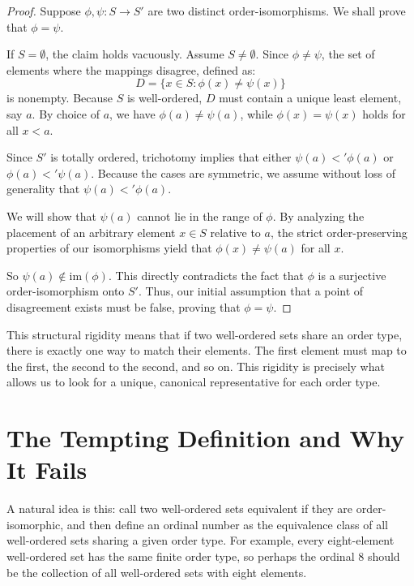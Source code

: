 \documentclass[11pt]{article}
\begin{document}
\begin{proof}
Suppose $\phi, \psi:S\to S'$ are two distinct order-isomorphisms. We shall prove that \(\phi=\psi\).

If \(S=\emptyset\), the claim holds vacuously. Assume \(S\neq\emptyset\). Since $\phi \neq \psi$, the set of elements where the mappings disagree, defined as:
\[
D=\{x\in S:\phi(x)\neq\psi(x)\}
\]
is nonempty. Because \(S\) is well-ordered, \(D\) must contain a unique least element, say \(a\). By choice of $a$, we have $\phi(a)\neq \psi(a)$, while $\phi(x)=\psi(x)$ holds for all $x < a$.

Since \(S'\) is totally ordered, trichotomy implies that either $\psi(a)<'\phi(a)$ or $\phi(a)<'\psi(a)$. Because the cases are symmetric, we assume without loss of generality that $\psi(a)<'\phi(a)$.

We will show that \(\psi(a)\) cannot lie in the range of \(\phi\). By analyzing the placement of an arbitrary element $x \in S$ relative to $a$, the strict order-preserving properties of our isomorphisms yield that $\phi(x) \neq \psi(a)$ for all $x$.


So $\psi(a) \notin \text{im}(\phi)$. This directly contradicts the fact that $\phi$ is a surjective order-isomorphism onto $S'$. Thus, our initial assumption that a point of disagreement exists must be false, proving that $\phi = \psi$.
\end{proof}

This structural rigidity means that if two well-ordered sets share an order type, there is exactly one way to match their elements. The first element must map to the first, the second to the second, and so on. This rigidity is precisely what allows us to look for a unique, canonical representative for each order type.

\section{The Tempting Definition and Why It Fails}

A natural idea is this: call two well-ordered sets equivalent if they are order-isomorphic, and then define an ordinal number as the equivalence class of all well-ordered sets sharing a given order type. For example, every eight-element well-ordered set has the same finite order type, so perhaps the ordinal $8$ should be the collection of all well-ordered sets with eight elements.
\end{document}
